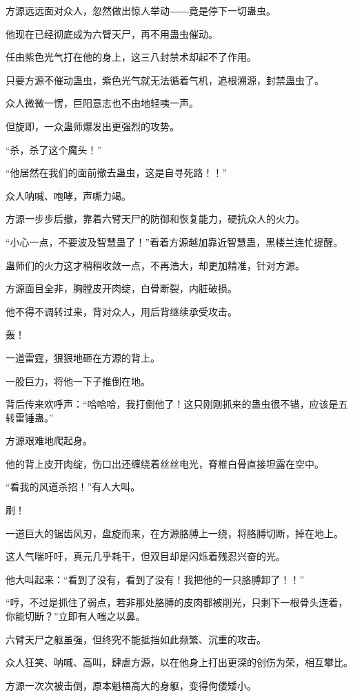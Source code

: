 \begin{this_body}
方源远远面对众人，忽然做出惊人举动――竟是停下一切蛊虫。

他现在已经彻底成为六臂天尸，再不用蛊虫催动。

任由紫色光气打在他的身上，这三八封禁术却起不了作用。

只要方源不催动蛊虫，紫色光气就无法循着气机，追根溯源，封禁蛊虫了。

众人微微一愣，巨阳意志也不由地轻咦一声。

但旋即，一众蛊师爆发出更强烈的攻势。

“杀，杀了这个魔头！”

“他居然在我们的面前撤去蛊虫，这是自寻死路！！”

众人呐喊、咆哮，声嘶力竭。

方源一步步后撤，靠着六臂天尸的防御和恢复能力，硬抗众人的火力。

“小心一点，不要波及智慧蛊了！”看着方源越加靠近智慧蛊，黑楼兰连忙提醒。

蛊师们的火力这才稍稍收敛一点，不再浩大，却更加精准，针对方源。

方源面目全非，胸膛皮开肉绽，白骨断裂，内脏破损。

他不得不调转过来，背对众人，用后背继续承受攻击。

轰！

一道雷霆，狠狠地砸在方源的背上。

一股巨力，将他一下子推倒在地。

背后传来欢呼声：“哈哈哈，我打倒他了！这只刚刚抓来的蛊虫很不错，应该是五转雷锤蛊。”

方源艰难地爬起身。

他的背上皮开肉绽，伤口出还缠绕着丝丝电光，脊椎白骨直接坦露在空中。

“看我的风道杀招！”有人大叫。

刷！

一道巨大的锯齿风刃，盘旋而来，在方源胳膊上一绕，将胳膊切断，掉在地上。

这人气喘吁吁，真元几乎耗干，但双目却是闪烁着残忍兴奋的光。

他大叫起来：“看到了没有，看到了没有！我把他的一只胳膊卸了！！”

“哼，不过是抓住了弱点，若非那处胳膊的皮肉都被削光，只剩下一根骨头连着，你能切断？”立即有人嗤之以鼻。

六臂天尸之躯虽强，但终究不能抵挡如此频繁、沉重的攻击。

众人狂笑、呐喊、高叫，肆虐方源，以在他身上打出更深的创伤为荣，相互攀比。

方源一次次被击倒，原本魁梧高大的身躯，变得佝偻矮小。


\end{this_body}
